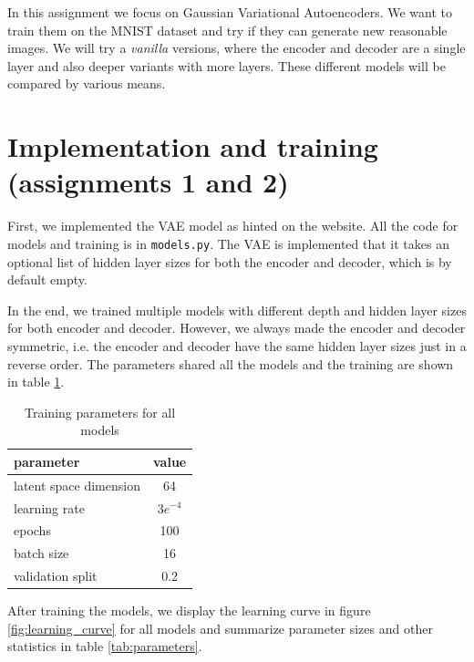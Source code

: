 \documentclass[a4paper,11pt]{article}
\begin{document}
In this assignment we focus on Gaussian Variational Autoencoders.
We want to train them on the MNIST dataset and try if they can generate new reasonable images.
We will try a \textit{vanilla} versions, where the encoder and decoder are a single layer and also deeper variants with more layers.
These different models will be compared by various means.

\section*{Implementation and training (assignments 1 and 2)}
First, we implemented the VAE model as hinted on the website.
All the code for models and training is in \texttt{models.py}.
The VAE is implemented that it takes an optional list of hidden layer sizes for both the encoder and decoder, which is by default empty.

In the end, we trained multiple models with different depth and hidden layer sizes for both encoder and decoder.
However, we always made the encoder and decoder symmetric, i.e. the encoder and decoder have the same hidden layer sizes just in a reverse order.
The parameters shared all the models and the training are shown in table \ref{tab:training_params}.

\begin{table}[ht]
    \centering
    \begin{tabular}{| l | c |}
        \hline
        \textbf{parameter}     & \textbf{value} \\
        \hline
        \hline
        latent space dimension & 64             \\
        \hline
        learning rate          & $3e^{-4}$      \\
        \hline
        epochs                 & 100            \\
        \hline
        batch size             & 16             \\
        \hline
        validation split       & 0.2            \\
        \hline
    \end{tabular}
    \caption{Training parameters for all models}
    \label{tab:training_params}
\end{table}

After training the models, we display the learning curve in figure \ref{fig:learning_curve} for all models and summarize parameter sizes and other statistics in table \ref{tab:parameters}.
\end{document}
